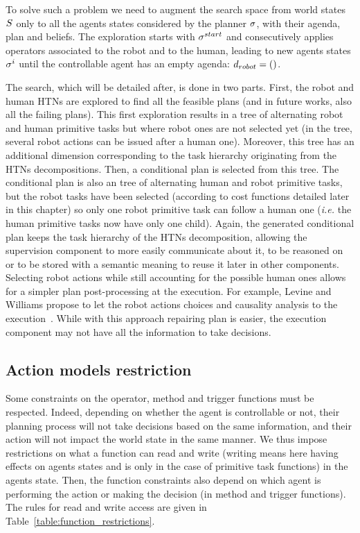 \documentclass[a4paper,11pt,twoside]{StyleThese}
\begin{document}
To solve such a problem we need to augment the search space from world states $S$ only to all the agents states considered by the planner $\sigma$, with their agenda, plan and beliefs. The exploration starts with $\sigma^{start}$ and consecutively applies operators associated to the robot and to the human, leading to new agents states $\sigma^{i}$ until the controllable agent has an empty agenda: $d_{robot} = ()$.

The search, which will be detailed after, is done in two parts. First, the robot and human HTNs are explored to find all the feasible plans (and in future works, also all the failing plans). This first exploration results in a tree of alternating robot and human primitive tasks but where robot ones are not selected yet (in the tree, several robot actions can be issued after a human one). Moreover, this tree has an additional dimension corresponding to the task hierarchy originating from the HTNs decompositions. Then, a conditional plan is selected from this tree. The conditional plan is also an tree of alternating human and robot primitive tasks, but the robot tasks have been selected (according to cost functions detailed later in this chapter) so only one robot primitive task can follow a human one (\textit{i.e.} the human primitive tasks now have only one child). Again, the generated conditional plan keeps the task hierarchy of the HTNs decomposition, allowing the supervision component to more easily communicate about it, to be reasoned on or to be stored with a semantic meaning to reuse it later in other components. Selecting robot actions while still accounting for the possible human ones allows for a simpler plan post-processing at the execution. For example, Levine and Williams propose to let the robot actions choices and causality analysis to the execution~\cite{levine2014concurrent}. While with this approach repairing plan is easier, the execution component may not have all the information to take decisions.

\subsection{Action models restriction}


Some constraints on the operator, method and trigger functions must be respected. Indeed, depending on whether the agent is controllable or not, their planning process will not take decisions based on the same information, and their action will not impact the world state in the same manner. We thus impose restrictions on what a function can read and write (writing means here having effects on agents states and is only in the case of primitive task functions) in the agents state. Then, the function constraints also depend on which agent is performing the action or making the decision (in method and trigger functions). The rules for read and write access are given in Table~\ref{table:function_restrictions}. 
\end{document}
